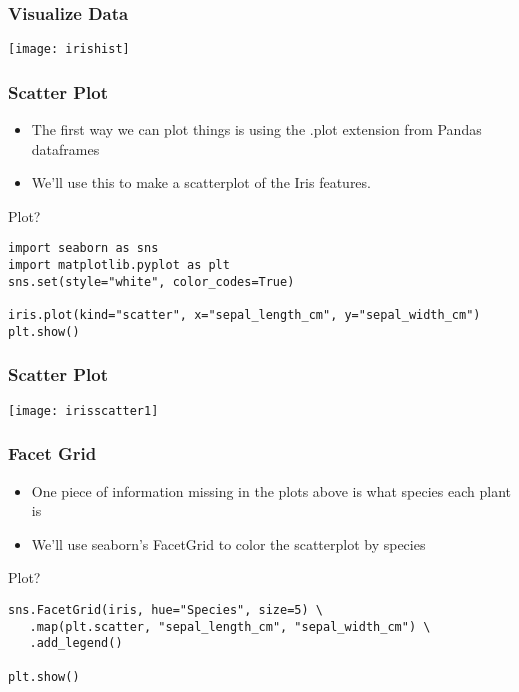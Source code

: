 \begin{frame}[fragile]\frametitle{Visualize Data}
\begin{center}
\texttt{[image: irishist]}
\end{center}
\end{frame}

%


\begin{frame}[fragile]\frametitle{Scatter Plot}
\begin{itemize}
\item The first way we can plot things is using the .plot extension from Pandas dataframes
\item We'll use this to make a scatterplot of the Iris features.
\end{itemize}

Plot?

\begin{lstlisting}
import seaborn as sns
import matplotlib.pyplot as plt
sns.set(style="white", color_codes=True)

iris.plot(kind="scatter", x="sepal_length_cm", y="sepal_width_cm")
plt.show()
\end{lstlisting}

\end{frame}

\begin{frame}[fragile]\frametitle{Scatter Plot}
\begin{center}
\texttt{[image: irisscatter1]}
\end{center}
\end{frame}


\begin{frame}[fragile]\frametitle{Facet Grid}
\begin{itemize}
\item One piece of information missing in the plots above is what species each plant is
\item We'll use seaborn's FacetGrid to color the scatterplot by species
\end{itemize}
Plot?
\begin{lstlisting}
sns.FacetGrid(iris, hue="Species", size=5) \
   .map(plt.scatter, "sepal_length_cm", "sepal_width_cm") \
   .add_legend()

plt.show()
\end{lstlisting}

\end{frame}

